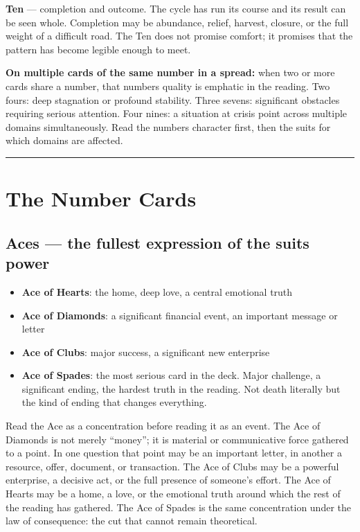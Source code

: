\textbf{Ten} --- completion and outcome. The cycle has run its course and its
result can be seen whole. Completion may be abundance, relief, harvest, closure,
or the full weight of a difficult road. The Ten does not promise comfort; it
promises that the pattern has become legible enough to meet.

\textbf{On multiple cards of the same number in a spread:} when two or more cards share a number, that number\textquotesingle s quality is emphatic in the reading. Two fours: deep stagnation or profound stability. Three sevens: significant obstacles requiring serious attention. Four nines: a situation at crisis point across multiple domains simultaneously. Read the number\textquotesingle s character first, then the suits for which domains are affected.

\begin{center}\rule{0.5\linewidth}{0.5pt}\end{center}

\section{The Number Cards}\label{the-number-cards}

\subsection{Aces --- the fullest expression of the suit\textquotesingle s power}\label{aces--the-fullest-expression-of-the-suits-power}

\begin{itemize}
\tightlist
\item
  \textbf{Ace of Hearts}: the home, deep love, a central emotional truth
\item
  \textbf{Ace of Diamonds}: a significant financial event, an important message or letter
\item
  \textbf{Ace of Clubs}: major success, a significant new enterprise
\item
  \textbf{Ace of Spades}: the most serious card in the deck. Major challenge, a significant ending, the hardest truth in the reading. Not death literally but the kind of ending that changes everything.
\end{itemize}

Read the Ace as a concentration before reading it as an event. The Ace of
Diamonds is not merely ``money''; it is material or communicative force gathered
to a point. In one question that point may be an important letter, in another a
resource, offer, document, or transaction. The Ace of Clubs may be a powerful
enterprise, a decisive act, or the full presence of someone's effort. The Ace
of Hearts may be a home, a love, or the emotional truth around which the rest of
the reading has gathered. The Ace of Spades is the same concentration under the
law of consequence: the cut that cannot remain theoretical.

